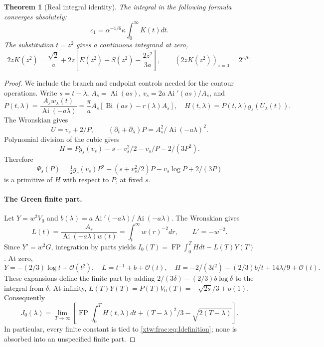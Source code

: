 \documentclass[11pt]{article}
\newtheorem{theorem}{Theorem}[section]
\theoremstyle{remark}\newtheorem{remark}[theorem]{Remark}
\newcommand{\OO}{\mathcal O}
\newcommand{\Ai}{\operatorname{Ai}}
\newcommand{\Bi}{\operatorname{Bi}}
\newcommand{\FP}{\operatorname{FP}}
\begin{document}
\begin{theorem}[Real integral identity]\label{xtw:frac:thm:realintegral}
The integral in the following formula converges absolutely:
\begin{equation}\label{xtw:frac:eq:realconstant}
 c_1=\alpha^{-1/6}\kappa\int_0^\infty K(t)dt.
\end{equation}
The substitution $t=z^2$ gives a continuous integrand at zero,
\begin{equation}\label{xtw:frac:eq:transformedkernel}
 2zK(z^2)=\frac{\sqrt2}{a}
           +2z\left[E(z^2)-S(z^2)-\frac{2z^2}{3a}\right],
 \qquad (2zK(z^2))_{z=0}=2^{5/6}.
\end{equation}
\end{theorem}
\begin{proof}
We include the branch and endpoint controls needed for the contour
operations. Write $s=t-\lambda$, $A_s=\Ai(as)$,
$v_s=2a\Ai'(as)/A_s$, and
\[
 P(t,\lambda)=\frac{A_sw_\lambda(t)}{\Ai(-a\lambda)}
       =\frac\pi a A_s[\Bi(as)-r(\lambda)A_s],\quad
 H(t,\lambda)=P(t,\lambda)g_s(U_\lambda(t)).
\]
The Wronskian gives
\begin{equation}\label{xtw:frac:eq:Greenalgebra}
 U=v_s+2/P,\qquad
 (\partial_t+\partial_\lambda)P=A_s^2/\Ai(-a\lambda)^2.
\end{equation}
Polynomial division of the cubic gives
\[
 H=P g_s(v_s)-s-v_s^2/2-v_s/P-2/(3P^2).
\]
Therefore
\begin{equation}\label{xtw:frac:eq:primitive}
 \Psi_s(P)=\tfrac12g_s(v_s)P^2-(s+v_s^2/2)P-v_s\log P+2/(3P)
\end{equation}
is a primitive of $H$ with respect to $P$, at fixed $s$.

\paragraph{The Green finite part.}
Let $Y=w^2V_0$ and $b(\lambda)=a\Ai'(-a\lambda)/\Ai(-a\lambda)$.
The Wronskian gives
\[
 L(t)=\frac{A_s}{\Ai(-a\lambda)w(t)}=\int_t^\infty w(r)^{-2}dr,
 \qquad L'=-w^{-2}.
\]
Since $Y'=w^2G$, integration by parts yields
$I_0(T)=\FP\int_0^T Hdt-L(T)Y(T)$.
At zero,
\[
 Y=-(2/3)\log t+\OO(t^2),\quad L=t^{-1}+b+\OO(t),\quad
 H=-2/(3t^2)-(2/3)b/t+14\lambda/9+\OO(t).
\]
These expansions define the finite part by adding
$2/(3\delta)-(2/3)b\log\delta$ to the integral from $\delta$.
At infinity, $L(T)Y(T)=P(T)V_0(T)=-\sqrt{2s}/3+o(1)$.
Consequently
\begin{equation}\label{xtw:frac:eq:GreenJ}
 J_0(\lambda)=\lim_{T\to\infty}
 \left[\FP\int_0^TH(t,\lambda)dt+(T-\lambda)^2/3
                                      -\sqrt{2(T-\lambda)}\right].
\end{equation}
In particular, every finite constant is tied to
\eqref{xtw:frac:eq:Idefinition}; none is absorbed into an unspecified finite part.


\end{proof}
\end{document}
